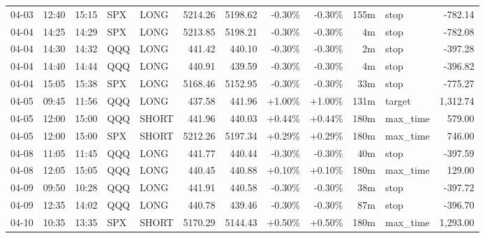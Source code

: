 \documentclass[11pt,a4paper,twoside]{article}
\begin{document}
\begin{center}
\begin{longtable}{>{\color{txtmain}}l l l l l r r r r r >{\color{txtmain}}l r}
04-03 & 12:40 & 15:15 & SPX & LONG & 5214.26 & 5198.62 & \textcolor{lossred}{-0.30\%} & \textcolor{lossred}{-0.30\%} & 155m & stop & \textcolor{lossred}{-782.14} \\
04-04 & 14:25 & 14:29 & SPX & LONG & 5213.85 & 5198.21 & \textcolor{lossred}{-0.30\%} & \textcolor{lossred}{-0.30\%} & 4m & stop & \textcolor{lossred}{-782.08} \\
04-04 & 14:30 & 14:32 & QQQ & LONG & 441.42 & 440.10 & \textcolor{lossred}{-0.30\%} & \textcolor{lossred}{-0.30\%} & 2m & stop & \textcolor{lossred}{-397.28} \\
04-04 & 14:40 & 14:44 & QQQ & LONG & 440.91 & 439.59 & \textcolor{lossred}{-0.30\%} & \textcolor{lossred}{-0.30\%} & 4m & stop & \textcolor{lossred}{-396.82} \\
04-04 & 15:05 & 15:38 & SPX & LONG & 5168.46 & 5152.95 & \textcolor{lossred}{-0.30\%} & \textcolor{lossred}{-0.30\%} & 33m & stop & \textcolor{lossred}{-775.27} \\
04-05 & 09:45 & 11:56 & QQQ & LONG & 437.58 & 441.96 & \textcolor{wingreen}{+1.00\%} & \textcolor{wingreen}{+1.00\%} & 131m & target & \textcolor{wingreen}{1,312.74} \\
04-05 & 12:00 & 15:00 & QQQ & SHORT & 441.96 & 440.03 & \textcolor{wingreen}{+0.44\%} & \textcolor{wingreen}{+0.44\%} & 180m & max\_time & \textcolor{wingreen}{579.00} \\
04-05 & 12:00 & 15:00 & SPX & SHORT & 5212.26 & 5197.34 & \textcolor{wingreen}{+0.29\%} & \textcolor{wingreen}{+0.29\%} & 180m & max\_time & \textcolor{wingreen}{746.00} \\
04-08 & 11:05 & 11:45 & QQQ & LONG & 441.77 & 440.44 & \textcolor{lossred}{-0.30\%} & \textcolor{lossred}{-0.30\%} & 40m & stop & \textcolor{lossred}{-397.59} \\
04-08 & 12:05 & 15:05 & QQQ & LONG & 440.45 & 440.88 & \textcolor{wingreen}{+0.10\%} & \textcolor{wingreen}{+0.10\%} & 180m & max\_time & \textcolor{wingreen}{129.00} \\
04-09 & 09:50 & 10:28 & QQQ & LONG & 441.91 & 440.58 & \textcolor{lossred}{-0.30\%} & \textcolor{lossred}{-0.30\%} & 38m & stop & \textcolor{lossred}{-397.72} \\
04-09 & 12:35 & 14:02 & QQQ & LONG & 440.78 & 439.46 & \textcolor{lossred}{-0.30\%} & \textcolor{lossred}{-0.30\%} & 87m & stop & \textcolor{lossred}{-396.70} \\
04-10 & 10:35 & 13:35 & SPX & SHORT & 5170.29 & 5144.43 & \textcolor{wingreen}{+0.50\%} & \textcolor{wingreen}{+0.50\%} & 180m & max\_time & \textcolor{wingreen}{1,293.00} \\

\end{longtable}
\end{center}
\end{document}
